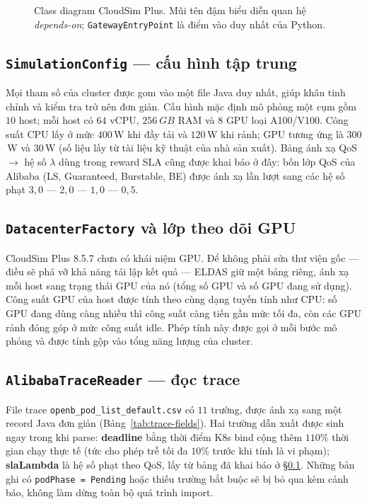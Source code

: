 \begin{figure}[H]
  \caption{Class diagram CloudSim Plus. Mũi tên đậm biểu diễn quan hệ
  \emph{depends-on}; \texttt{GatewayEntryPoint} là điểm vào duy nhất của
  Python.}
  \label{fig:class-diagram}
\end{figure}

\subsection{\texttt{SimulationConfig} --- cấu hình tập trung}
\label{ssec:config}
Mọi tham số của cluster được gom vào một file Java duy nhất, giúp khâu
tinh chỉnh và kiểm tra trở nên đơn giản. Cấu hình mặc định mô phỏng
một cụm gồm $10$ host; mỗi host có $64$ vCPU, $\SI{256}{GB}$ RAM và $8$
GPU loại A100/V100. Công suất CPU lấy ở mức $400$\,W khi đầy tải và
$120$\,W khi rảnh; GPU tương ứng là $300$\,W và $30$\,W (số liệu lấy
từ tài liệu kỹ thuật của nhà sản xuất). Bảng ánh xạ QoS $\to$ hệ số
$\lambda$ dùng trong reward SLA cũng được khai báo ở đây: bốn lớp QoS
của Alibaba (LS, Guaranteed, Burstable, BE) được ánh xạ lần lượt sang
các hệ số phạt $3{,}0$ --- $2{,}0$ --- $1{,}0$ --- $0{,}5$.

\subsection{\texttt{DatacenterFactory} và lớp theo dõi GPU}
\label{ssec:factory}
CloudSim Plus 8.5.7 chưa có khái niệm GPU. Để không phải sửa thư viện
gốc --- điều sẽ phá vỡ khả năng tái lập kết quả --- ELDAS giữ một bảng
riêng, ánh xạ mỗi host sang trạng thái GPU của nó (tổng số GPU và số
GPU đang sử dụng). Công suất GPU của host được tính theo cùng dạng
tuyến tính như CPU: số GPU đang dùng càng nhiều thì công suất càng
tiến gần mức tối đa, còn các GPU rảnh đóng góp ở mức công suất idle.
Phép tính này được gọi ở mỗi bước mô phỏng và được tính gộp vào tổng
năng lượng của cluster.

\subsection{\texttt{AlibabaTraceReader} --- đọc trace}
\label{ssec:trace}
File trace \texttt{openb\_pod\_list\_default.csv} có $11$ trường, được
ánh xạ sang một record Java đơn giản (Bảng~\ref{tab:trace-fields}). Hai
trường dẫn xuất được sinh ngay trong khi parse: \textbf{deadline} bằng
thời điểm K8s bind cộng thêm $110\%$ thời gian chạy thực tế (tức cho
phép trễ tối đa $10\%$ trước khi tính là vi phạm); \textbf{slaLambda}
là hệ số phạt theo QoS, lấy từ bảng đã khai báo ở §\ref{ssec:config}.
Những bản ghi có \texttt{podPhase = Pending} hoặc thiếu trường bắt
buộc sẽ bị bỏ qua kèm cảnh báo, không làm dừng toàn bộ quá trình
import.

